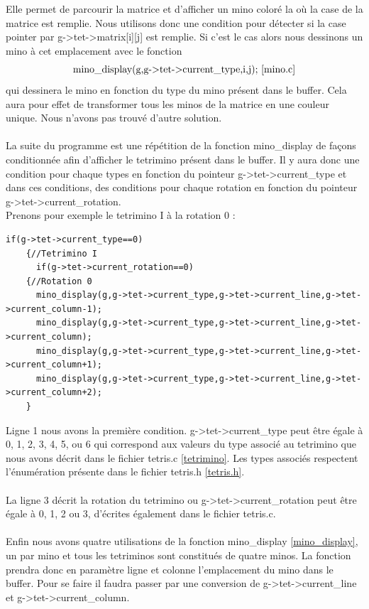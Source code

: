 \documentclass[a4paper,10p]{report}
\begin{document}
Elle permet de parcourir la matrice et d'afficher un mino coloré la où la case de la matrice est remplie. Nous utilisons donc une condition pour détecter si la case pointer par g->tet->matrix[i][j] est remplie. Si c'est le cas alors nous dessinons un mino à cet emplacement avec le fonction
\begin{equation*}
    \text{mino\_display(g,g->tet->current\_type,i,j); \ref{mino.c}}
\end{equation*}
qui dessinera le mino en fonction du type du mino présent dans le buffer. Cela aura pour effet de transformer tous les minos de la matrice en une couleur unique. Nous n'avons pas trouvé d'autre solution.
\\\\
La suite du programme est une répétition de la fonction mino\_display de façons conditionnée afin d'afficher le tetrimino présent dans le buffer. Il y aura donc une condition pour chaque types en fonction du pointeur g->tet->current\_type et dans ces conditions, des conditions pour chaque rotation en fonction du pointeur g->tet->current\_rotation.
\\
Prenons pour exemple le tetrimino I à la rotation 0 :
\begin{lstlisting}
if(g->tet->current_type==0)
    {//Tetrimino I
      if(g->tet->current_rotation==0)
	{//Rotation 0
	  mino_display(g,g->tet->current_type,g->tet->current_line,g->tet->current_column-1);
	  mino_display(g,g->tet->current_type,g->tet->current_line,g->tet->current_column);
	  mino_display(g,g->tet->current_type,g->tet->current_line,g->tet->current_column+1);
	  mino_display(g,g->tet->current_type,g->tet->current_line,g->tet->current_column+2);
	}
\end{lstlisting}
Ligne \textcolor{gris}{1} nous avons la première condition. g->tet->current\_type peut être égale à 0, 1, 2, 3, 4, 5, ou 6 qui correspond aux valeurs du type associé au tetrimino que nous avons décrit dans le fichier tetris.c \ref{tetrimino}. Les types associés respectent l'énumération présente dans le fichier tetris.h \ref{tetris.h}.
\\
\\La ligne \textcolor{gris}{3} décrit la rotation du tetrimino ou g->tet->current\_rotation peut être égale à 0, 1, 2 ou 3, d'écrites également dans le fichier tetris.c.
\\
\\Enfin nous avons quatre utilisations de la fonction mino\_display \ref{mino_display}, un par mino et tous les tetriminos sont constitués de quatre minos. La fonction prendra donc en paramètre ligne et colonne l'emplacement du mino dans le buffer. Pour se faire il faudra passer par une conversion de g->tet->current\_line et g->tet->current\_column.
\end{document}
